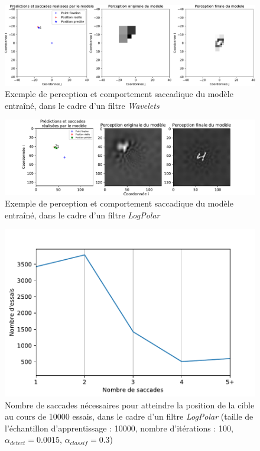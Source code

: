 \begin{figure}[th]
\centering
\includegraphics[scale=0.5]{Figures/saccades_wavelets}
\decoRule
\caption[Figure]{Exemple de perception et comportement saccadique du modèle entraîné, dans le cadre d'un filtre \textit{Wavelets}}
\label{fig:saccades_wavelets}
\end{figure}

\begin{figure}[th]
\centering
\includegraphics[scale=0.75]{Figures/saccades_logpolar}
\decoRule
\caption[Figure]{Exemple de perception et comportement saccadique du modèle entraîné, dans le cadre d'un filtre \textit{LogPolar}}
\label{fig:saccades_logpolar}
\end{figure}

\begin{figure}[th]
\centering
\includegraphics{Figures/logpolar_sacc_nombre}
\decoRule
\caption[Figure]{Nombre de saccades nécessaires pour atteindre la position de la cible au cours de 10000 essais, dans le cadre d'un filtre \textit{LogPolar} (taille de l'échantillon d'apprentissage :  10000, nombre d'itérations : 100, $\alpha_{detect}=0.0015$, $\alpha_{classif}=0.3$)}
\label{fig:sacc_nombre}
\end{figure}

